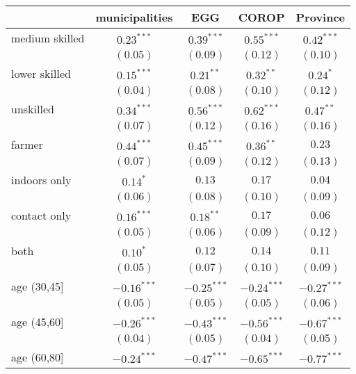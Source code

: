 
\begin{table}
\begin{center}
\begin{small}
\begin{tabular}{l c c c c}
\hline
 & municipalities & EGG & COROP & Province \\
\hline
medium skilled & $0.23^{***}$  & $0.39^{***}$  & $0.55^{***}$  & $0.42^{***}$  \\
               & $(0.05)$      & $(0.09)$      & $(0.12)$      & $(0.10)$      \\
lower skilled  & $0.15^{***}$  & $0.21^{**}$   & $0.32^{**}$   & $0.24^{*}$    \\
               & $(0.04)$      & $(0.08)$      & $(0.10)$      & $(0.12)$      \\
unskilled      & $0.34^{***}$  & $0.56^{***}$  & $0.62^{***}$  & $0.47^{**}$   \\
               & $(0.07)$      & $(0.12)$      & $(0.16)$      & $(0.16)$      \\
farmer         & $0.44^{***}$  & $0.45^{***}$  & $0.36^{**}$   & $0.23$        \\
               & $(0.07)$      & $(0.09)$      & $(0.12)$      & $(0.13)$      \\
indoors only   & $0.14^{*}$    & $0.13$        & $0.17$        & $0.04$        \\
               & $(0.06)$      & $(0.08)$      & $(0.10)$      & $(0.09)$      \\
contact only   & $0.16^{***}$  & $0.18^{**}$   & $0.17$        & $0.06$        \\
               & $(0.05)$      & $(0.06)$      & $(0.09)$      & $(0.12)$      \\
both           & $0.10^{*}$    & $0.12$        & $0.14$        & $0.11$        \\
               & $(0.05)$      & $(0.07)$      & $(0.10)$      & $(0.09)$      \\
age (30,45]    & $-0.16^{***}$ & $-0.25^{***}$ & $-0.24^{***}$ & $-0.27^{***}$ \\
               & $(0.05)$      & $(0.05)$      & $(0.05)$      & $(0.06)$      \\
age (45,60]    & $-0.26^{***}$ & $-0.43^{***}$ & $-0.56^{***}$ & $-0.67^{***}$ \\
               & $(0.04)$      & $(0.05)$      & $(0.04)$      & $(0.05)$      \\
age (60,80]    & $-0.24^{***}$ & $-0.47^{***}$ & $-0.65^{***}$ & $-0.77^{***}$ \\

\end{tabular}
\end{small}
\end{center}
\end{table}
